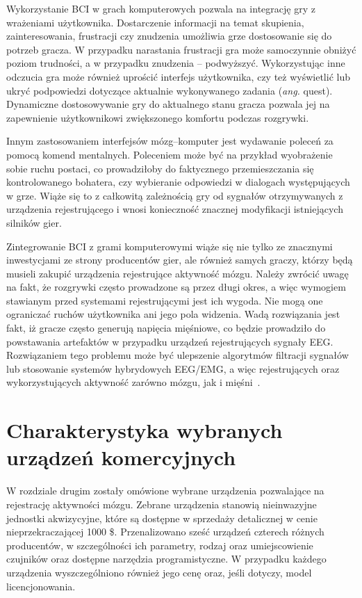 \documentclass[skorowidz,skroty]{dyplomWEZUT}
\begin{document}
Wykorzystanie BCI w grach komputerowych pozwala na integrację gry z wrażeniami użytkownika. Dostarczenie informacji na temat skupienia, zainteresowania, frustracji czy znudzenia umożliwia grze dostosowanie się do potrzeb gracza. W przypadku narastania frustracji gra może samoczynnie obniżyć poziom trudności, a w przypadku znudzenia -- podwyższyć. Wykorzystując inne odczucia gra może również uprościć interfejs użytkownika, czy też wyświetlić lub ukryć podpowiedzi dotyczące aktualnie wykonywanego zadania (\textit{ang.} quest). Dynamiczne dostosowywanie gry do aktualnego stanu gracza pozwala jej na zapewnienie użytkownikowi zwiększonego komfortu podczas rozgrywki.

Innym zastosowaniem interfejsów mózg--komputer jest wydawanie poleceń za pomocą komend mentalnych. Poleceniem może być na przykład wyobrażenie sobie ruchu postaci, co prowadziłoby do faktycznego przemieszczania się kontrolowanego bohatera, czy wybieranie odpowiedzi w dialogach występujących w grze. Wiąże się to z całkowitą zależnością gry od sygnałów otrzymywanych z urządzenia rejestrującego i wnosi konieczność znacznej modyfikacji istniejących silników gier.

Zintegrowanie BCI z grami komputerowymi wiąże się nie tylko ze znacznymi inwestycjami ze strony producentów gier, ale również samych graczy, którzy będą musieli zakupić urządzenia rejestrujące aktywność mózgu. Należy zwrócić uwagę na fakt, że rozgrywki często prowadzone są przez długi okres, a więc wymogiem stawianym przed systemami rejestrującymi jest ich wygoda. Nie mogą one ograniczać ruchów użytkownika ani jego pola widzenia. Wadą rozwiązania jest fakt, iż gracze często generują napięcia mięśniowe, co będzie prowadziło do powstawania artefaktów w przypadku urządzeń rejestrujących sygnały EEG. Rozwiązaniem tego problemu może być ulepszenie algorytmów filtracji sygnałów lub stosowanie systemów hybrydowych EEG/EMG, a więc rejestrujących oraz wykorzystujących aktywność zarówno mózgu, jak i mięśni~\cite{bci_introduction}.


\chapter{Charakterystyka wybranych urządzeń komercyjnych\label{chap:headsets}}
W rozdziale drugim zostały omówione wybrane urządzenia pozwalające na rejestrację aktywności mózgu. Zebrane urządzenia stanowią nieinwazyjne jednostki akwizycyjne, które są dostępne w sprzedaży detalicznej w cenie nieprzekraczającej 1000 \$. Przenalizowano sześć urządzeń czterech różnych producentów, w szczególności ich parametry, rodzaj oraz umiejscowienie czujników oraz dostępne narzędzia programistyczne. W przypadku każdego urządzenia wyszczególniono również jego cenę oraz, jeśli dotyczy, model licencjonowania.
\end{document}
